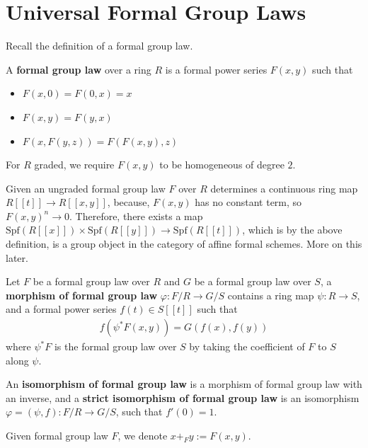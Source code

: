 \section{Universal Formal Group Laws}\label{sec:chromatichomotopy-formalgrouplaw}
Recall the definition of a formal group law.

\begin{definition}
    A \textbf{formal group law} over a ring $R$ is a formal power series $F(x,y)$ such that 
    \begin{itemize}
        \item $F(x,0)=F(0,x)=x$
        \item $F(x,y)=F(y,x)$
        \item $F(x,F(y,z))=F(F(x,y),z)$
    \end{itemize}
For $R$ graded, we require $F(x,y)$ to be homogeneous of degree $2$.
\end{definition}
\begin{remark}
    Given an ungraded formal group law $F$ over $R$ determines a continuous ring map $R[[t]]\to R[[x,y]]$, because, $F(x,y)$ has no constant term, so $F(x,y)^n\to 0$. Therefore, there exists a map
     $\mathrm{Spf}(R[[x]])\times \mathrm{Spf}(R[[y]])\to \mathrm{Spf}(R[[t]])$, which is by the above definition, is a group object in the category of affine formal schemes. More on this later.
\end{remark}

\begin{definition}
    Let $F$ be a formal group law over $R$ and $G$ be a formal group law over $S$, a \textbf{morphism of formal group law} $\varphi: F/R\to G/S$ contains a ring map $\psi: R\to S$, and a formal power series $f(t)\in S[[t]]$ such that 
    \begin{align*}
        f(\psi^*F(x,y))=G(f(x),f(y))
    \end{align*}
    where $\psi^*F$ is the formal group law over $S$ by taking the coefficient of $F$ to $S$ along $\psi$.  

    An \textbf{isomorphism of formal group law} is a morphism of formal group law with an inverse, and a \textbf{strict isomorphism of formal group law} is an isomorphism $\varphi=(\psi, f): F/R\to G/S$, such that $f'(0)=1$.
\end{definition}

Given formal group law $F$, we denote $x+_F y:=F(x,y)$.


